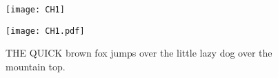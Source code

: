 \documentclass{article}
\begin{document}
\lipsum[2]

\begin{figure}[h] %
\begin{minipage}[t]{.49\linewidth}
\texttt{[image: CH1]}
\end{minipage}\hfill
\begin{minipage}[b]{.49\linewidth}
\texttt{[image: CH1.pdf]}
\end{minipage}
\caption{THE QUICK brown fox jumps over the little lazy dog over the mountain top.}
\end{figure}
\lipsum[3]
\end{document}
